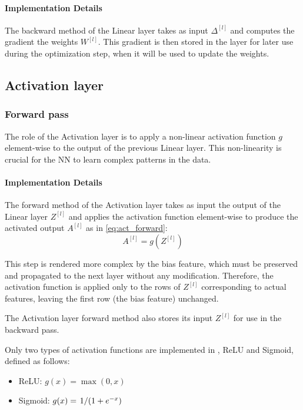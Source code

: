 \paragraph{Implementation Details} The backward method of the Linear layer takes as input $\Delta^{[l]}$ and computes the gradient \wrt the weights $W^{[l]}$. This gradient is then stored in the layer for later use during the optimization step, when it will be used to update the weights.

\subsection{Activation layer}
\subsubsection{Forward pass}
The role of the Activation layer is to apply a non-linear activation function $g$ element-wise to the output of the previous Linear layer. This non-linearity is crucial for the \acl{NN} to learn complex patterns in the data.

\paragraph{Implementation Details} The forward method of the Activation layer takes as input the output of the Linear layer $Z^{[l]}$ and applies the activation function element-wise to produce the activated output $A^{[l]}$ as in \cref{eq:act_forward}:
\begin{equation}
    A^{[l]} = g(Z^{[l]})
\end{equation}

This step is rendered more complex by the bias feature, which must be preserved and propagated to the next layer without any modification. Therefore, the activation function is applied only to the rows of $Z^{[l]}$ corresponding to actual features, leaving the first row (the bias feature) unchanged.

The Activation layer forward method also stores its input $Z^{[l]}$ for use in the backward pass.

Only two types of activation functions are implemented in \mfnet, ReLU and Sigmoid, defined as follows:
\begin{itemize}
    \item ReLU: $g(x) = \max(0, x)$
    \item Sigmoid: $g(x) = \flatfrac{1}{(1 + e^{-x})}$
\end{itemize}

